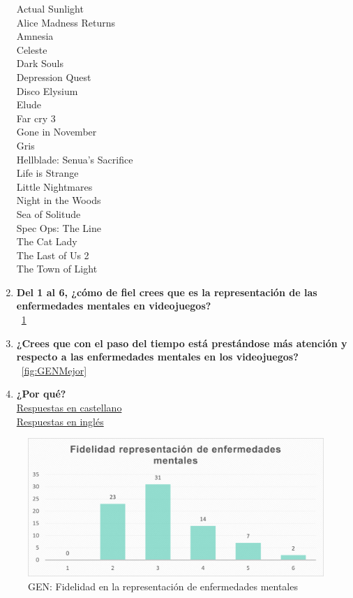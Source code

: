 \documentclass[12pt, a4paper,twoside,titlepage]{book}
\begin{document}
\begin{enumerate}[label=\textbf{\arabic*}.]
    Actual Sunlight \\
    Alice Madness Returns\\
    Amnesia\\
    Celeste\\
    Dark Souls\\
    Depression Quest \\
    Disco Elysium\\
    Elude\\
    Far cry 3\\
    Gone in November\\
    Gris\\
    Hellblade: Senua’s Sacrifice\\
    Life is Strange\\
    Little Nightmares\\
    Night in the Woods\\
    Sea of Solitude\\
    Spec Ops: The Line\\
    The Cat Lady\\
    The Last of Us 2\\
    The Town of Light\\

     \item \textbf{Del 1 al 6, ¿cómo de fiel crees que es la representación de las enfermedades mentales en videojuegos?}\\
    ~\ref{fig:GENFidel}
     \item \textbf{¿Crees que con el paso del tiempo está prestándose más atención y respecto a las enfermedades mentales en los videojuegos?}\\
    ~\ref{fig:GENMejor}
     \item \textbf{¿Por qué? }\\
     \hyperref[mejorCastellano]{Respuestas en castellano}\\
     \hyperref[mejorIngles]{Respuestas en inglés}
\end{enumerate}



\begin{figure}
    \centering
    \includegraphics[width=.8\linewidth]{ANEXO Gen/19AnexGENFid}
    \caption{GEN: Fidelidad en la representación de enfermedades mentales}
    \label{fig:GENFidel}
\end{figure}
\end{document}

